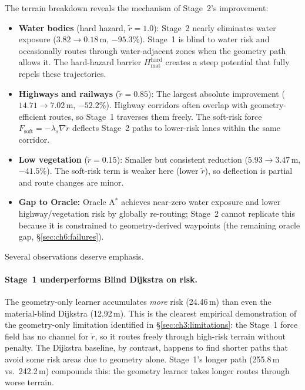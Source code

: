 The terrain breakdown reveals the mechanism of Stage~2's improvement:
\begin{itemize}
  \item \textbf{Water bodies} (hard hazard, $\tilde r=1.0$): Stage~2
    nearly eliminates water exposure ($3.82 \to 0.18$\,m, $-95.3\%$).
    Stage~1 is blind to water risk and occasionally routes through
    water-adjacent zones when the geometry path allows it.
    The hard-hazard barrier $H_{\mathrm{mat}}^{\mathrm{hard}}$ creates
    a steep potential that fully repels these trajectories.
  \item \textbf{Highways and railways} ($\tilde r=0.85$): The largest
    absolute improvement ($14.71 \to 7.02$\,m, $-52.2\%$).
    Highway corridors often overlap with geometry-efficient routes,
    so Stage~1 traverses them freely.
    The soft-risk force $F_{\mathrm{soft}}=-\lambda_s\nabla\tilde r$
    deflects Stage~2 paths to lower-risk lanes within the same corridor.
  \item \textbf{Low vegetation} ($\tilde r=0.15$): Smaller but
    consistent reduction ($5.93 \to 3.47$\,m, $-41.5\%$).
    The soft-risk term is weaker here (lower $\tilde r$), so deflection
    is partial and route changes are minor.
  \item \textbf{Gap to Oracle:} Oracle A$^*$ achieves near-zero water
    exposure and lower highway/vegetation risk by globally re-routing;
    Stage~2 cannot replicate this because it is constrained to
    geometry-derived waypoints (the remaining oracle gap,
    §\ref{sec:ch6:failures}).
\end{itemize}

Several observations deserve emphasis.

\paragraph{Stage~1 underperforms Blind Dijkstra on risk.}
The geometry-only learner accumulates \emph{more} risk (24.46\,m)
than even the material-blind Dijkstra (12.92\,m).
This is the clearest empirical demonstration of the geometry-only
limitation identified in §\ref{sec:ch3:limitations}: the Stage~1
force field has no channel for $\tilde{r}$, so it routes freely
through high-risk terrain without penalty.
The Dijkstra baseline, by contrast, happens to find shorter paths that
avoid some risk areas due to geometry alone.
Stage~1's longer path (255.8\,m vs.\ 242.2\,m) compounds this:
the geometry learner takes longer routes through worse terrain.

